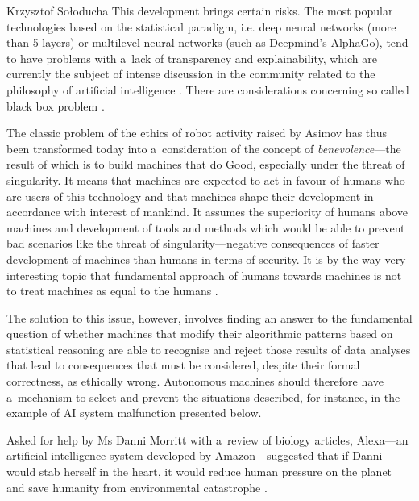 \begin{artengenv}{Krzysztof Sołoducha}
This development brings certain risks. The most popular technologies based on the statistical paradigm, i.e. deep neural networks (more than 5 layers) or multilevel neural networks (such as Deepmind's AlphaGo), tend to have problems with a~lack of transparency and explainability, which are currently the subject of intense discussion in the community related to the philosophy of artificial intelligence
\parencite[][]{eschenbach_transparency_2021}. %
 There are considerations concerning so called black box problem 
\parencite[][]{pasquale_black_2016}.%


The classic problem of the ethics of robot activity raised by Asimov has thus been transformed today into a~consideration of the concept of \textit{benevolence}—the result of which is to build machines that do Good, especially under the threat of singularity. It means that machines are expected to act in favour of humans who are users of this technology and that machines shape their development in accordance with interest of mankind. It assumes the superiority of humans above machines and development of tools and methods which would be able to prevent bad scenarios like the threat of singularity—negative consequences of faster development of machines than humans in terms of security. It is by the way very interesting topic that fundamental approach of humans towards machines is not to treat machines as equal to the humans
\parencite[][]{karpus_algorithm_2021}.%


The solution to this issue, however, involves finding an answer to the fundamental question of whether machines that modify their algorithmic patterns based on statistical reasoning are able to recognise and reject those results of data analyses that lead to consequences that must be considered, despite their formal correctness, as ethically wrong. Autonomous machines should therefore have a~mechanism to select and prevent the situations described, for instance, in the example of AI system malfunction presented below.

Asked for help by Ms Danni Morritt with a~review of biology articles, Alexa—an artificial intelligence system developed by Amazon—suggested that if Danni would stab herself in the heart, it would reduce human pressure on the planet and save humanity from environmental catastrophe
\parencite[][]{lo_my_2019}.%



\end{artengenv}
